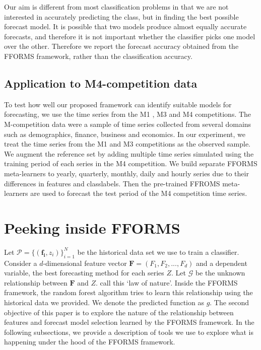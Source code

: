 \documentclass[11pt,a4paper,]{article}
\begin{document}
Our aim is different from most classification problems in that we are not interested in accurately predicting the class, but in finding the best possible forecast model. It is possible that two models produce almost equally accurate forecasts, and therefore it is not important whether the classifier picks one model over the other. Therefore we report the forecast accuracy obtained from the FFORMS framework, rather than the classification accuracy.

\hypertarget{application-to-m4-competition-data}{%
\subsection{Application to M4-competition data}\label{application-to-m4-competition-data}}

To test how well our proposed framework can identify suitable models for forecasting, we use the time series from the M1 \autocite{makridakis1982accuracy}, M3 \autocite{makridakis2000m3} and M4 \autocite{makridakis2019m4} competitions. The M-competition data were a sample of time series collected from several domains such as demographics, finance, business and economics. In our experiment, we treat the time series from the M1 and M3 competitions as the observed sample. We augment the reference set by adding multiple time series simulated using the training period of each series in the M4 competition. We build separate FFORMS meta-learners to yearly, quarterly, monthly, daily and hourly series due to their differences in features and classlabels. Then the pre-trained FFROMS meta-learners are used to forecast the test period of the M4 competition time series.

\hypertarget{peeking}{%
\section{Peeking inside FFORMS}\label{peeking}}

Let \(\mathcal{P}=\{(\mathbf{f_i}, z_i)\}_{i=1}^{N}\) be the
historical data set we use to train a classifier. Consider a
\(d\)-dimensional feature vector \(\mathbf{F}=(F_1, F_2, ..., F_d)\) and a dependent
variable, the best forecasting method for each series \(Z\). Let \(\mathcal{G}\) be the unknown relationship between \(\mathbf{F}\) and
\(Z\). \textcite{Zhao} call this `law of nature'. Inside the FFORMS framework, the random forest algorithm tries to learn this relationship using
the historical data we provided. We denote the predicted function as
\(g\). The second objective of this paper is to explore the nature of the relationship between features and forecast model selection learned by the FFORMS framework. In the following subsections, we provide a description of tools we use to explore what is happening under the hood of the FFORMS framework.
\end{document}
